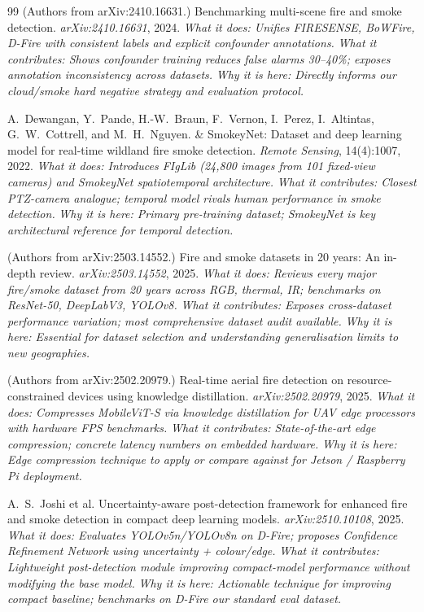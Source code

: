 \documentclass[11pt,twocolumn]{article}
\begin{document}
\begin{thebibliography}{99}
(Authors from arXiv:2410.16631.)
\newblock Benchmarking multi-scene fire and smoke detection.
\newblock \textit{arXiv:2410.16631}, 2024.
\newblock \textit{What it does: Unifies FIRESENSE, BoWFire, D-Fire with
consistent labels and explicit confounder annotations.}
\newblock \textit{What it contributes: Shows confounder training reduces
false alarms 30--40\%; exposes annotation inconsistency across datasets.}
\newblock \textit{Why it is here: Directly informs our cloud/smoke hard
negative strategy and evaluation protocol.}

A.~Dewangan, Y.~Pande, H.-W.~Braun, F.~Vernon, I.~Perez, I.~Altintas,
G.~W.~Cottrell, and M.~H.~Nguyen.
 \& {SmokeyNet}: Dataset and deep learning model for
real-time wildland fire smoke detection.
\newblock \textit{Remote Sensing}, 14(4):1007, 2022.
\newblock \textit{What it does: Introduces FIgLib (24,800 images from
101 fixed-view cameras) and SmokeyNet spatiotemporal architecture.}
\newblock \textit{What it contributes: Closest PTZ-camera analogue;
temporal model rivals human performance in smoke detection.}
\newblock \textit{Why it is here: Primary pre-training dataset;
SmokeyNet is key architectural reference for temporal detection.}

(Authors from arXiv:2503.14552.)
\newblock Fire and smoke datasets in 20 years: An in-depth review.
\newblock \textit{arXiv:2503.14552}, 2025.
\newblock \textit{What it does: Reviews every major fire/smoke dataset
from 20 years across RGB, thermal, IR; benchmarks on ResNet-50,
DeepLabV3, YOLOv8.}
\newblock \textit{What it contributes: Exposes cross-dataset performance
variation; most comprehensive dataset audit available.}
\newblock \textit{Why it is here: Essential for dataset selection and
understanding generalisation limits to new geographies.}

(Authors from arXiv:2502.20979.)
\newblock Real-time aerial fire detection on resource-constrained devices
using knowledge distillation.
\newblock \textit{arXiv:2502.20979}, 2025.
\newblock \textit{What it does: Compresses MobileViT-S via knowledge
distillation for UAV edge processors with hardware FPS benchmarks.}
\newblock \textit{What it contributes: State-of-the-art edge compression;
concrete latency numbers on embedded hardware.}
\newblock \textit{Why it is here: Edge compression technique to apply
or compare against for Jetson / Raspberry Pi deployment.}

A.~S.~Joshi et al.
\newblock Uncertainty-aware post-detection framework for enhanced fire
and smoke detection in compact deep learning models.
\newblock \textit{arXiv:2510.10108}, 2025.
\newblock \textit{What it does: Evaluates YOLOv5n/YOLOv8n on D-Fire;
proposes Confidence Refinement Network using uncertainty + colour/edge.}
\newblock \textit{What it contributes: Lightweight post-detection module
improving compact-model performance without modifying the base model.}
\newblock \textit{Why it is here: Actionable technique for improving
compact baseline; benchmarks on D-Fire our standard eval dataset.}


\end{thebibliography}
\end{document}
